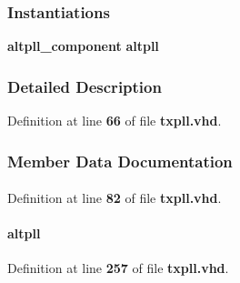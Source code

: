 \subsubsection*{Instantiations}
 \begin{DoxyCompactItemize}
\item 
{\bf altpll\+\_\+component}  {\bfseries altpll}   
\end{DoxyCompactItemize}


\subsubsection{Detailed Description}


Definition at line {\bf 66} of file {\bf txpll.\+vhd}.



\subsubsection{Member Data Documentation}
\paragraph[{altpll}]{ {\bfseries \textcolor{vhdlchar}{ }} \hspace{0.3cm}{\ttfamily [Component]}}\label{classtxpll_1_1SYN_ad45c11bbc2e898d68e19fa2eb5ba73d5}


Definition at line {\bf 82} of file {\bf txpll.\+vhd}.

\paragraph[{altpll\+\_\+component}]{ {\bfseries \textcolor{vhdlchar}{altpll}\textcolor{vhdlchar}{ }} \hspace{0.3cm}{\ttfamily [Instantiation]}}\label{classtxpll_1_1SYN_a70fc906d546df6812934a5430ac231a3}


Definition at line {\bf 257} of file {\bf txpll.\+vhd}.


